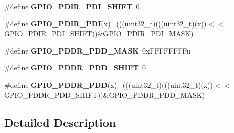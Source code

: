 \begin{DoxyCompactItemize}
\item 
\hypertarget{group___g_p_i_o___register___masks_ga99fd9212dd769bb1964a28a864c6c741}{}\#define {\bfseries G\+P\+I\+O\+\_\+\+P\+D\+I\+R\+\_\+\+P\+D\+I\+\_\+\+S\+H\+I\+F\+T}~0\label{group___g_p_i_o___register___masks_ga99fd9212dd769bb1964a28a864c6c741}

\item 
\hypertarget{group___g_p_i_o___register___masks_ga51ee39b660f7d6b95d1348601346dd0d}{}\#define {\bfseries G\+P\+I\+O\+\_\+\+P\+D\+I\+R\+\_\+\+P\+D\+I}(x)                                              ~(((uint32\+\_\+t)(((uint32\+\_\+t)(x))$<$$<$G\+P\+I\+O\+\_\+\+P\+D\+I\+R\+\_\+\+P\+D\+I\+\_\+\+S\+H\+I\+F\+T))\&G\+P\+I\+O\+\_\+\+P\+D\+I\+R\+\_\+\+P\+D\+I\+\_\+\+M\+A\+S\+K)\label{group___g_p_i_o___register___masks_ga51ee39b660f7d6b95d1348601346dd0d}

\item 
\hypertarget{group___g_p_i_o___register___masks_ga67567a60f48d2bfb5584cd8de8936788}{}\#define {\bfseries G\+P\+I\+O\+\_\+\+P\+D\+D\+R\+\_\+\+P\+D\+D\+\_\+\+M\+A\+S\+K}~0x\+F\+F\+F\+F\+F\+F\+F\+Fu\label{group___g_p_i_o___register___masks_ga67567a60f48d2bfb5584cd8de8936788}

\item 
\hypertarget{group___g_p_i_o___register___masks_gacdd12c96f7650759c90a98bb606bd776}{}\#define {\bfseries G\+P\+I\+O\+\_\+\+P\+D\+D\+R\+\_\+\+P\+D\+D\+\_\+\+S\+H\+I\+F\+T}~0\label{group___g_p_i_o___register___masks_gacdd12c96f7650759c90a98bb606bd776}

\item 
\hypertarget{group___g_p_i_o___register___masks_gaa61392b4895082b114fe3d251998069d}{}\#define {\bfseries G\+P\+I\+O\+\_\+\+P\+D\+D\+R\+\_\+\+P\+D\+D}(x)                                              ~(((uint32\+\_\+t)(((uint32\+\_\+t)(x))$<$$<$G\+P\+I\+O\+\_\+\+P\+D\+D\+R\+\_\+\+P\+D\+D\+\_\+\+S\+H\+I\+F\+T))\&G\+P\+I\+O\+\_\+\+P\+D\+D\+R\+\_\+\+P\+D\+D\+\_\+\+M\+A\+S\+K)\label{group___g_p_i_o___register___masks_gaa61392b4895082b114fe3d251998069d}

\end{DoxyCompactItemize}


\subsection{Detailed Description}
